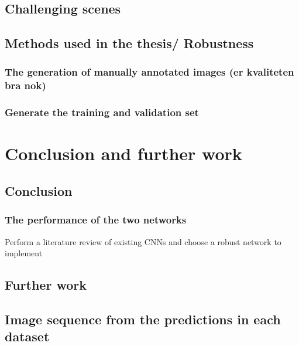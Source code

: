 \documentclass[USenglish]{ifimaster}  %
\begin{document}
\section{Challenging scenes}

\section{Methods used in the thesis/ Robustness}
\subsection{The generation of manually annotated images (er kvaliteten bra nok)}
\subsection{Generate the training and validation set}


\chapter{Conclusion and further work}
\section{Conclusion}
\subsection{The performance of the two networks}
Perform a literature review of existing CNNs and choose a robust network to implement
\section{Further work}

\begin{appendices}
\chapter{Image sequence from the predictions in each dataset}
\end{appendices}

\backmatter{}
\printbibliography
\end{document}
